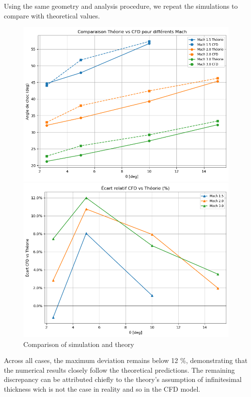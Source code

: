 Using the same geometry and analysis procedure, we repeat the simulations to compare with theoretical values.
\begin{figure}[H]
    \centering
    \begin{minipage}[b]{0.45\linewidth}
        \centering
        \includegraphics[width=\linewidth]{ressources/figures/sol1.png}
    \end{minipage}
    \hfill
    \begin{minipage}[b]{0.45\linewidth}
        \centering
        \includegraphics[width=\linewidth]{ressources/figures/sol2.png}
    \end{minipage}
    \caption{Comparison of simulation and theory}
    \label{fig:sol}
\end{figure}

Across all cases, the maximum deviation remains below 12 \%, demonstrating that the numerical results closely follow the theoretical predictions. The remaining discrepancy can be attributed chiefly to the theory’s assumption of infinitesimal thickness wich is not the case in reality and so in the CFD model.